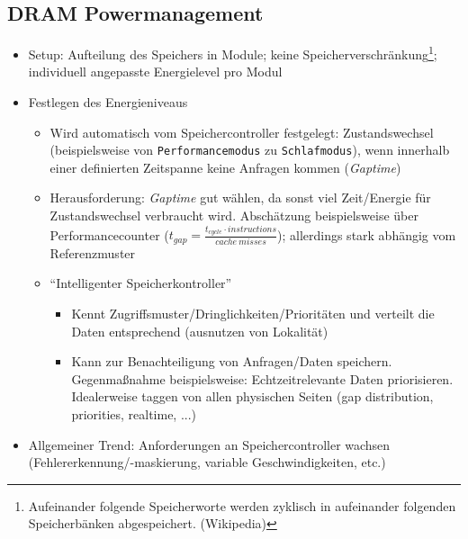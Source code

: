 \subsection{DRAM Powermanagement}
\begin{itemize}
	\item Setup: Aufteilung des Speichers in Module; keine Speicherverschränkung\footnote{Aufeinander folgende Speicherworte werden zyklisch in aufeinander folgenden Speicherbänken abgespeichert. (Wikipedia)}; individuell angepasste Energielevel pro Modul
	\item Festlegen des Energieniveaus
	\begin{itemize}
		\item Wird automatisch vom Speichercontroller festgelegt: Zustandswechsel (beispielsweise von \texttt{Performancemodus} zu \texttt{Schlafmodus}), wenn innerhalb einer definierten Zeitspanne keine Anfragen kommen (\textit{Gaptime})
		\item Herausforderung: \textit{Gaptime} gut wählen, da sonst viel Zeit/Energie für Zustandswechsel verbraucht wird. Abschätzung beispielsweise über Performancecounter (\(t_{gap}=\frac{t_{cycle} \cdot instructions}{cache~misses}\)); allerdings stark abhängig vom Referenzmuster
		\item "`Intelligenter Speicherkontroller"'
		\begin{itemize}
			\item Kennt Zugriffsmuster/Dringlichkeiten/Prioritäten und verteilt die Daten entsprechend (ausnutzen von Lokalität)
			\item Kann zur Benachteiligung von Anfragen/Daten speichern. Gegenmaßnahme beispielsweise: Echtzeitrelevante Daten priorisieren. Idealerweise taggen von allen physischen Seiten (gap distribution, priorities, realtime, ...)
		\end{itemize}
	\end{itemize}
	\item Allgemeiner Trend: Anforderungen an Speichercontroller wachsen (Fehlererkennung/-maskierung, variable Geschwindigkeiten, etc.)
\end{itemize}


